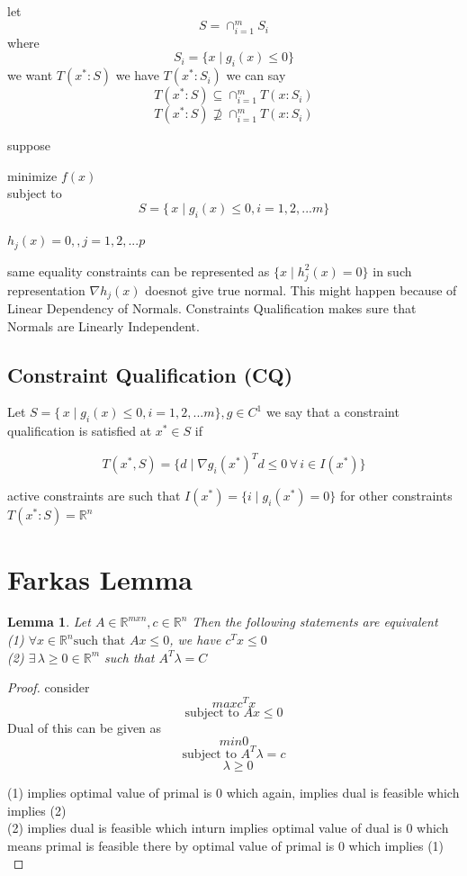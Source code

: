 \documentclass[twoside]{article}
\newtheorem{lemma}[theorem]{Lemma}
\begin{document}
let $$S = \cap^{m}_{i=1}S_i$$ where $$S_i = \{ x\mid g_i(x)\leq 0\}$$
we want $T(x^*:S)$ we have $T(x^*:S_i)$
we can say $$T(x^*:S) \subseteq \cap_{i=1}^{m}T(x:S_i)$$
$$T(x^*:S)\nsupseteq \cap_{i=1}^{m}T(x:S_i)$$

suppose 
\begin{center}
minimize $f(x)$\\
subject to $$S = \{\,x\mid g_{i}(x)\leq 0 , i = 1,2,...m\}$$\\
$h_j(x) = 0, , j = 1,2,...p$
\end{center}
same equality constraints can be represented as $\{ x \mid h^{2}_{j}(x) = 0\}$ in such representation $\nabla h_j(x)$ doesnot give true normal. This might happen because of Linear Dependency of Normals. Constraints Qualification makes sure that Normals are Linearly Independent.

\subsection{Constraint Qualification (CQ)}
Let $S = \{\,x\mid g_{i}(x)\leq 0 , i = 1,2,...m\},g \in C^{1}  $ we say that a constraint qualification is satisfied at $x^{*}\in S$ if 

$$ T(x^{*},S) = \{d \mid \nabla g_i(x^*)^Td \leq 0\, \forall\, i \in I(x^*)\}$$

active constraints are such that 
$I(x^*)=\{i\mid g_i(x^*)=0\}$
for other constraints $T(x^*:S)= \mathbb{R}^n$

\section{Farkas Lemma}
\begin{lemma}
Let $A\in\mathbb{R}^{m x n}, c\in \mathbb{R}^{n}$ Then the following statements are equivalent \\
(1) $\forall x \in \mathbb{R}^{n} \text{such that }Ax \leq 0 $, we have $c^{T}x\leq 0 $\\
(2) $ \exists \, \lambda \geq 0 \in \mathbb{R}^{m}$ such that $A^{T}\lambda = C $ 
\end{lemma}
\begin{proof}
	consider  $$max c^{T}x $$ $$ \text{subject to } Ax \leq 0$$ Dual of this can be given as $$min 0 $$ $$ \text{subject to }A^{T}\lambda = c$$  $$\text{           }\lambda \geq 0$$

(1) implies optimal value of primal is $0$ which again, implies dual is feasible which implies (2)\\
(2) implies dual is feasible which inturn implies optimal value of dual is 0 which means primal is feasible there by optimal value of primal is 0 which implies (1)\\
\end{proof}
\end{document}
